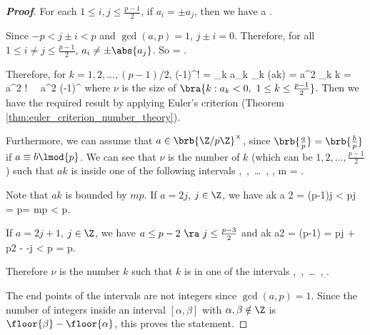 \begin{proof}[\bf Proof]
For each $1\leq i,j\leq \frac{p-1}2$, if $a_i = \pm a_j$, then we have
\be
{}a  .
\ee

Since $-p < j\pm i< p$ and $\gcd(a,p)=1$, $j\pm i = 0$. Therefore, for all $1\leq i\neq j \leq \frac{p-1}2$, $a_i\neq \pm \abs{a_j}$. So
\be
{} = .
\ee

Therefore, for $k = 1,2,\dots, (p-1)/2$,
\be
(-1)^\nu {}! = \prod_k a_k \equiv \prod_k (ak) = a^{2} \prod_k k  = a^{2} !  \ \ra\ a^{2} \equiv (-1)^\nu {}
\ee
where $\nu$ is the size of $\bra{k:a_k <0,\ 1\leq k\leq \frac{p-1}2}$. Then we have the required result by applying Euler's criterion (Theorem \ref{thm:euler_criterion_number_theory}).

Furthermore, we can assume that $a\in \brb{\Z/p\Z}^\times$, since $\brb{\frac ap} = \brb{\frac bp}$ if $a\equiv b  \lmod{p}$. We can see that $\nu$ is the number of $k$ (which can be $1,2,\dots,\frac{p-1}2$) such that $ak$ is inside one of the following intervals
\be
{},\ ,\ \dots\ , , \qquad m = .
\ee

Note that $ak$ is bounded by $mp$. If $a = 2j$, $j\in\Z$, we have
\be
ak \leq a 2 = (p-1)j < pj = p= mp < p.
\ee

If $a=2j+1 $, $j\in \Z$, we have $a\leq p-2 \ \ra\ j\leq \frac{p-3}2$ and
\be
ak \leq a2 = (p-1) = pj + \frac p2 -  -j < p = p.
\ee

Therefore $\nu$ is the number $k$ such that $k$ is in one of the intervals
\be
{},\ ,\ \dots\ , .
\ee

The end points of the intervals are not integers since $\gcd(a,p) =1$. Since the number of integers inside an interval $[\alpha,\beta]$ with $\alpha,\beta\notin\Z$ is $\floor{\beta} - \floor{\alpha}$, this proves the statement.
\end{proof}


